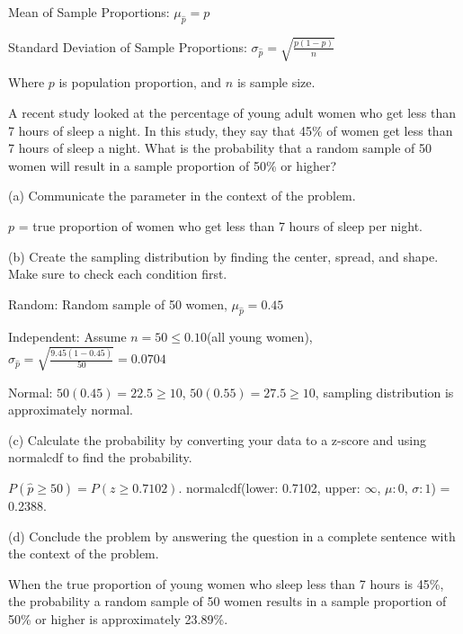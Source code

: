 \documentclass[../stats.tex]{subfiles}
\begin{document}
Mean of Sample Proportions: $\mu_{\hat{p}}=p$

Standard Deviation of Sample Proportions: $\sigma_{\hat{p}}=\sqrt{\frac{p(1-p)}{n}}$

Where $p$ is population proportion, and $n$ is sample size.

\begin{example}
    A recent study looked at the percentage of young adult women who get less than 7 hours of sleep a night. In this study, they say that 45\% of women get less than 7 hours of sleep a night.
    What is the probability that a random sample of 50 women will result in a sample proportion of 50\% or higher?

    (a) Communicate the parameter in the context of the problem.

    $p$ = true proportion of women who get less than 7 hours of sleep per night.

    (b) Create the sampling distribution by finding the center, spread, and shape. Make sure to check each condition first.

    Random: Random sample of 50 women, $\mu_{\hat{p}}=0.45$

    Independent: Assume $n=50\leq 0.10$(all young women), $\sigma_{\hat{p}}=\sqrt{\frac{9.45(1-0.45)}{50}}=0.0704$

    Normal: $50(0.45)=22.5\geq 10$, $50(0.55)=27.5\geq 10$, sampling distribution is approximately normal.

    (c) Calculate the probability by converting your data to a z-score and using normalcdf to find the probability.

    $P(\hat{p}\geq 50)=P(z\geq 0.7102)$. normalcdf(lower: 0.7102, upper: $\infty$, $\mu: 0$, $\sigma:1$) = 0.2388.

    (d) Conclude the problem by answering the question in a complete sentence with the context of the problem.

    When the true proportion of young women who sleep less than 7 hours is 45\%, the probability a random sample of 50 women results in a sample proportion of 50\% or higher is approximately 23.89\%.
\end{example}
\end{document}
